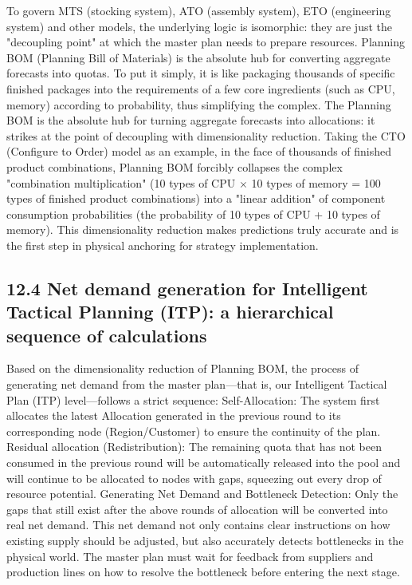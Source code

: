 \documentclass[11pt,a4paper]{article}
\begin{document}
To govern MTS (stocking system), ATO (assembly system), ETO (engineering system) and other models, the underlying logic is isomorphic: they are just the "decoupling point" at which the master plan needs to prepare resources. Planning BOM (Planning Bill of Materials) is the absolute hub for converting aggregate forecasts into quotas. To put it simply, it is like packaging thousands of specific finished packages into the requirements of a few core ingredients (such as CPU, memory) according to probability, thus simplifying the complex. The Planning BOM is the absolute hub for turning aggregate forecasts into allocations: it strikes at the point of decoupling with dimensionality reduction. Taking the CTO (Configure to Order) model as an example, in the face of thousands of finished product combinations, Planning BOM forcibly collapses the complex "combination multiplication" (10 types of CPU $\times$ 10 types of memory = 100 types of finished product combinations) into a "linear addition" of component consumption probabilities (the probability of 10 types of CPU + 10 types of memory). This dimensionality reduction makes predictions truly accurate and is the first step in physical anchoring for strategy implementation.


\subsection*{12.4 Net demand generation for Intelligent Tactical Planning (ITP): a hierarchical sequence of calculations}


Based on the dimensionality reduction of Planning BOM, the process of generating net demand from the master plan—that is, our Intelligent Tactical Plan (ITP) level—follows a strict sequence: Self-Allocation: The system first allocates the latest Allocation generated in the previous round to its corresponding node (Region/Customer) to ensure the continuity of the plan. Residual allocation (Redistribution): The remaining quota that has not been consumed in the previous round will be automatically released into the pool and will continue to be allocated to nodes with gaps, squeezing out every drop of resource potential. Generating Net Demand and Bottleneck Detection: Only the gaps that still exist after the above rounds of allocation will be converted into real net demand. This net demand not only contains clear instructions on how existing supply should be adjusted, but also accurately detects bottlenecks in the physical world. The master plan must wait for feedback from suppliers and production lines on how to resolve the bottleneck before entering the next stage.
\end{document}
